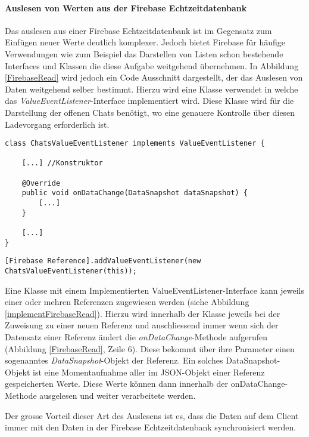 \documentclass[../main.tex]{subfiles}
\begin{document}
	\paragraph{Auslesen von Werten aus der Firebase Echtzeitdatenbank}
	Das auslesen aus einer Firebase Echtzeitdatenbank ist im Gegensatz zum Einfügen neuer Werte deutlich komplexer. Jedoch bietet Firebase für häufige Verwendungen wie zum Beispiel das Darstellen von Listen schon bestehende Interfaces und Klassen die diese Aufgabe weitgehend übernehmen. In Abbildung \ref{FirebaseRead} wird jedoch ein Code Ausschnitt dargestellt, der das Auslesen von Daten weitgehend selber bestimmt. Hierzu wird eine Klasse verwendet in welche das \emph{ValueEventListener}-Interface implementiert wird. Diese Klasse wird für die Darstellung der offenen Chats benötigt, wo eine genauere Kontrolle über diesen Ladevorgang erforderlich ist.
	
\begin{code}
	\begin{center}
		\begin{verbatim}
class ChatsValueEventListener implements ValueEventListener {
	
	[...] //Konstruktor
	
	@Override
	public void onDataChange(DataSnapshot dataSnapshot) {
		[...]
	}

	[...]
}
		\end{verbatim}
		\caption{ValueEventListener-Klasse für das Auslesen von Daten aus der Firebase Echtzeitdatenbank}
		\label{FirebaseRead}
	\end{center}
\end{code}

\begin{code}
	\begin{center}
		\begin{verbatim}
[Firebase Reference].addValueEventListener(new ChatsValueEventListener(this));
		\end{verbatim}
		\caption{Zuweisung eines ValueEventListeners zu einer Referenz}
		\label{implementFirebaseRead}
	\end{center}
\end{code}
	
	Eine Klasse mit einem Implementierten ValueEventListener-Interface kann jeweils einer oder mehren Referenzen zugewiesen werden (siehe Abbildung \ref{implementFirebaseRead}). Hierzu wird innerhalb der Klasse jeweils bei der Zuweisung zu einer neuen Referenz und anschliessend immer wenn sich der Datensatz einer Referenz ändert die \emph{onDataChange}-Methode aufgerufen (Abbildung \ref{FirebaseRead}, Zeile 6). Diese bekommt über ihre Parameter einen sogenanntes \emph{DataSnapshot}-Objekt der Referenz. Ein solches DataSnapshot-Objekt ist eine Momentaufnahme aller im JSON-Objekt einer Referenz gespeicherten Werte. Diese Werte können dann innerhalb der onDataChange-Methode ausgelesen und weiter verarbeitete werden.
	
	Der grosse Vorteil dieser Art des Auslesens ist es, dass die Daten auf dem Client immer mit den Daten in der Firebase Echtzeitdatenbank synchronisiert werden.
	
\end{document}
